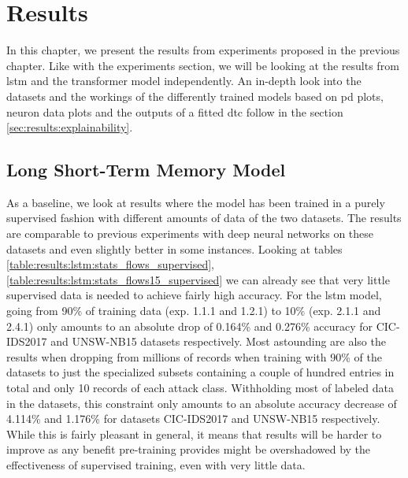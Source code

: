 \chapter{Results} \label{sec:results}

In this chapter, we present the results from experiments proposed in the previous chapter. Like with the experiments section, we will be looking at the results from \gls{lstm} and the transformer model independently. An in-depth look into the datasets and the workings of the differently trained models based on \gls{pd} plots, neuron data plots and the outputs of a fitted \gls{dtc} follow in the section \ref{sec:results:explainability}.

\section{Long Short-Term Memory Model} \label{sec:results:lstm}

As a baseline, we look at results where the model has been trained in a purely supervised fashion with different amounts of data of the two datasets. The results are comparable to previous experiments with deep neural networks on these datasets \cite{fog_based_detection_survey_2020} and even slightly better in some instances. Looking at tables \ref{table:results:lstm:stats_flows_supervised}, \ref{table:results:lstm:stats_flows15_supervised} we can already see that very little supervised data is needed to achieve fairly high accuracy. For the \gls{lstm} model, going from 90\% of training data (exp. 1.1.1 and 1.2.1) to 10\% (exp. 2.1.1 and 2.4.1) only amounts to an absolute drop of 0.164\% and 0.276\% accuracy for CIC-IDS2017 and UNSW-NB15 datasets respectively. Most astounding are also the results when dropping from millions of records when training with 90\% of the datasets to just the specialized subsets containing a couple of hundred entries in total and only 10 records of each attack class. Withholding most of labeled data in the datasets, this constraint only amounts to an absolute accuracy decrease of 4.114\% and 1.176\% for datasets CIC-IDS2017 and UNSW-NB15 respectively.
While this is fairly pleasant in general, it means that results will be harder to improve as any benefit pre-training provides might be overshadowed by the effectiveness of supervised training, even with very little data. \par



